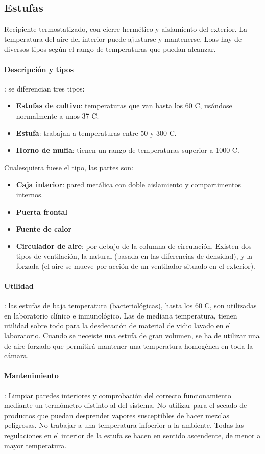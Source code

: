 \subsection{Estufas}
Recipiente termostatizado, con cierre hermético y aislamiento del exterior. La temperatura del aire del interior puede ajustarse y mantenerse. Loas hay de diversos tipos según el rango de temperaturas que puedan alcanzar.
\paragraph{Descripción y tipos}: se diferencian tres tipos:
\begin{itemize}[itemsep=0pt,parsep=0pt,topsep=0pt,partopsep=0pt]
    \item \textbf{Estufas de cultivo}: temperaturas que van hasta los 60 C, usándose normalmente a unos 37 C.
    \item\textbf{Estufa}: trabajan a temperaturas entre 50 y 300 C.
    \item\textbf{Horno de mufla}: tienen un rango de temperaturas superior a 1000 C.
\end{itemize}
Cualesquiera fuese el tipo, las partes son:
\begin{itemize}[itemsep=0pt,parsep=0pt,topsep=0pt,partopsep=0pt]
    \item \textbf{Caja interior}: pared metálica con doble aislamiento y compartimentos internos.
    \item\textbf{Puerta frontal}
    \item\textbf{Fuente de calor}
    \item\textbf{Circulador de aire}: por debajo de la columna de circulación. Existen dos tipos de ventilación, la natural (basada en las diferencias de densidad), y la forzada (el aire se mueve por acción de un ventilador situado en el exterior).
\end{itemize} 
\paragraph{Utilidad}: las estufas de baja temperatura (bacteriológicas), hasta los 60 C, son utilizadas en laboratorio clínico e inmunológico. Las de mediana temperatura, tienen utilidad sobre todo para la desdecación de material de vidio lavado en el laboratorio. Cuando se neceiste una estufa de gran volumen, se ha de utilizar una de aire forzado que permitirá mantener una temperatura homogénea en toda la cámara.
\paragraph{Mantenimiento}: Limpiar paredes interiores y comprobación del correcto funcionamiento mediante un termómetro distinto al del sistema. No utilizar para el secado de productos que puedan desprender vapores susceptibles de hacer mezclas peligrosas. No trabajar a una temperatura infoerior a la ambiente. Todas las regulaciones en el interior de la estufa se hacen en sentido ascendente, de menor a mayor temperatura.
